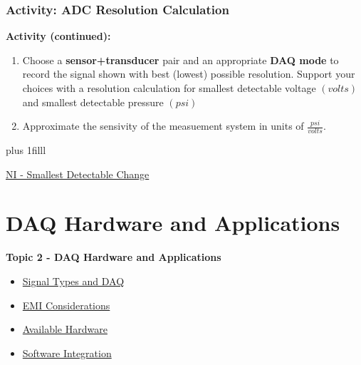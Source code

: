 \documentclass[fleqn]{beamer} %
\newcommand{\sectionIItitle}{DAQ Hardware and Applications}
\newcommand{\sectionIsubsectionIVtitle}{Activity: ADC Resolution Calculation}
\newcommand{\sectionIIsubsectionItitle}{Signal Types and DAQ}
\newcommand{\sectionIIsubsectionIItitle}{EMI Considerations}
\newcommand{\sectionIIsubsectionIIItitle}{Available Hardware}
\newcommand{\sectionIIsubsectionIVtitle}{Software Integration}
\newcommand{\btVFill}{\vskip0pt plus 1filll}
\begin{document}
			\begin{frame}
				\frametitle{\sectionIsubsectionIVtitle} \scriptsize

				\bigskip

				\textbf{Activity (continued):} 
					
				\begin{enumerate}
					
					\item Choose a {\bf sensor+transducer} pair and an appropriate {\bf DAQ mode} to record the signal shown with best (lowest) possible resolution. Support your choices with a resolution calculation for smallest detectable voltage $(volts)$ and smallest detectable pressure $(psi)$ \vspace{10mm}\\

					\item Approximate the sensivity of the measuement system in units of $\frac{psi}{volts}$. 

			
		
				\end{enumerate}	



				\btVFill
	
				{\tiny \href{https://www.ni.com/docs/en-US/bundle/daqhelp/page/codewidth.html}{NI - Smallest Detectable Change}}
										
			\end{frame}
	
	\section{\sectionIItitle}\label{sectionII}

		\begin{frame}
			\large \textbf{Topic 2 - \sectionIItitle} \vspace{3mm}\\

			\begin{itemize}
				\item \hyperlink{sectionIIsubsectionI}{\sectionIIsubsectionItitle} \vspc %
				\item \hyperlink{sectionIIsubsectionII}{\sectionIIsubsectionIItitle} \vspc %
				\item \hyperlink{sectionIIsubsectionIII}{\sectionIIsubsectionIIItitle} \vspc %
				\item \hyperlink{sectionIIsubsectionIV}{\sectionIIsubsectionIVtitle} \vspc %
			\end{itemize}

		\end{frame}
\end{document}
